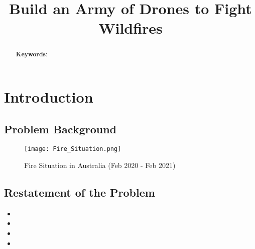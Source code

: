 \documentclass[12pt]{article}  %
\title{Build an Army of Drones to Fight Wildfires}  %
\begin{document}
\begin{abstract}
    


    \vspace{5pt}  %
    \textbf{Keywords}: 

\end{abstract}

\maketitle  %

\tableofcontents  %


\section{Introduction}

\subsection{Problem Background} %


\begin{figure}[htbp]  %
\centering  %
\texttt{[image: Fire\_Situation.png]} %
\caption{Fire Situation in Australia (Feb 2020 - Feb 2021)} %
\label{fig:Fire Situation} %
\end{figure}



\subsection{Restatement of the Problem} %



\begin{itemize} %
\setlength{\parsep}{0ex} %
\setlength{\topsep}{2ex} %
\setlength{\itemsep}{1ex} %
\item 
\item 
\item
\item 
\end{itemize}
\end{document}
